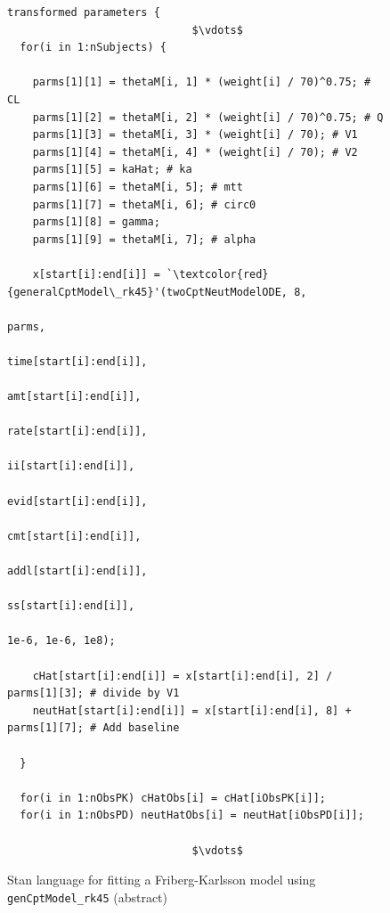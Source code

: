 \documentclass[11pt]{amsart}
\newenvironment{fmpage}[1]
     {\begin{lrbox}{\fmbox}\begin{minipage}{#1}}
     {\end{minipage}\end{lrbox}\fbox{\usebox{\fmbox}}}
\begin{document}
\begin{figure}
\caption{Stan language for fitting a Friberg-Karlsson model using \texttt{genCptModel\_rk45} (abstract)}
\begin{tiny}
\begin{center}
\begin{fmpage}{\textwidth - .75in}
\begin{lstlisting}[basicstyle=\tiny\ttfamily,mathescape=true,flexiblecolumns=true,frame=single,escapeinside=`']
transformed parameters {
                             $\vdots$
  for(i in 1:nSubjects) {

    parms[1][1] = thetaM[i, 1] * (weight[i] / 70)^0.75; # CL
    parms[1][2] = thetaM[i, 2] * (weight[i] / 70)^0.75; # Q
    parms[1][3] = thetaM[i, 3] * (weight[i] / 70); # V1
    parms[1][4] = thetaM[i, 4] * (weight[i] / 70); # V2
    parms[1][5] = kaHat; # ka
    parms[1][6] = thetaM[i, 5]; # mtt
    parms[1][7] = thetaM[i, 6]; # circ0
    parms[1][8] = gamma;
    parms[1][9] = thetaM[i, 7]; # alpha

    x[start[i]:end[i]] = `\textcolor{red}{generalCptModel\_rk45}'(twoCptNeutModelODE, 8,
                                                           parms, 
                                                           time[start[i]:end[i]], 
                                                           amt[start[i]:end[i]], 
                                                           rate[start[i]:end[i]], 
                                                           ii[start[i]:end[i]], 
                                                           evid[start[i]:end[i]], 
                                                           cmt[start[i]:end[i]], 
                                                           addl[start[i]:end[i]], 
                                                           ss[start[i]:end[i]],
                                                           1e-6, 1e-6, 1e8);
                             
    cHat[start[i]:end[i]] = x[start[i]:end[i], 2] / parms[1][3]; # divide by V1
    neutHat[start[i]:end[i]] = x[start[i]:end[i], 8] + parms[1][7]; # Add baseline
    
  }
  
  for(i in 1:nObsPK) cHatObs[i] = cHat[iObsPK[i]];
  for(i in 1:nObsPD) neutHatObs[i] = neutHat[iObsPD[i]];

                             $\vdots$  
\end{lstlisting}
\end{fmpage}
\end{center}
\end{tiny} 
\label{FKCode}
\end{figure}
\end{document}
